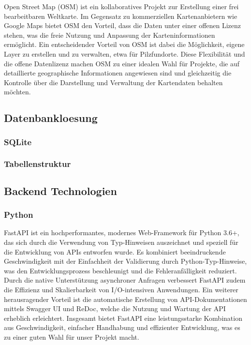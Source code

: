 \documentclass[../main.tex]{subfiles} %
\begin{document}
Open Street Map (OSM) ist ein kollaboratives Projekt zur Erstellung einer frei bearbeitbaren Weltkarte. Im Gegensatz zu kommerziellen
Kartenanbietern wie Google Maps bietet OSM den Vorteil, dass die Daten unter einer offenen Lizenz stehen, was die freie Nutzung und
Anpassung der Karteninformationen ermöglicht. Ein entscheidender Vorteil von OSM ist dabei die Möglichkeit, eigene Layer zu erstellen und 
zu verwalten, etwa für Pilzfundorte. Diese Flexibilität und die offene Datenlizenz machen OSM zu einer idealen Wahl für Projekte, die auf 
detaillierte geographische Informationen angewiesen sind und gleichzeitig die Kontrolle über die Darstellung und Verwaltung der Kartendaten 
behalten möchten.

\subsection{Datenbankloesung} %

\subsubsection{SQLite}

\subsubsection{Tabellenstruktur}

\subsection{Backend Technologien} %

\subsubsection{Python}



FastAPI ist ein hochperformantes, modernes Web-Framework für Python 3.6+, das sich durch die Verwendung von Typ-Hinweisen auszeichnet und speziell für die Entwicklung von APIs entworfen wurde.
Es kombiniert beeindruckende Geschwindigkeit mit der Einfachheit der Validierung durch Python-Typ-Hinweise, was den Entwicklungsprozess beschleunigt und die Fehleranfälligkeit reduziert. 
Durch die native Unterstützung asynchroner Anfragen verbessert FastAPI zudem die Effizienz und Skalierbarkeit von I/O-intensiven Anwendungen. 
Ein weiterer herausragender Vorteil ist die automatische Erstellung von API-Dokumentationen mittels Swagger UI und ReDoc, welche die Nutzung und Wartung der API erheblich erleichtert. 
Insgesamt bietet FastAPI eine leistungsstarke Kombination aus Geschwindigkeit, einfacher Handhabung und effizienter Entwicklung, was es zu einer guten Wahl für unser Projekt macht.
\end{document}
